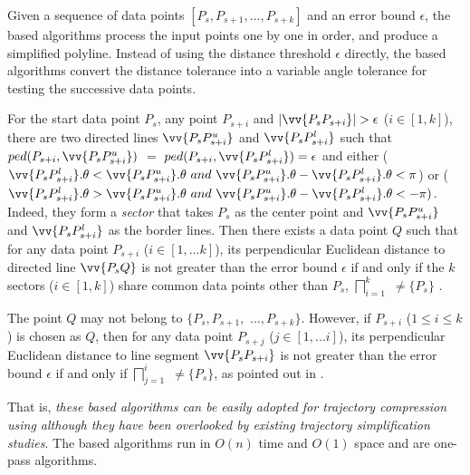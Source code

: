 
Given a sequence of data points $[P_{s}, P_{s+1}, \ldots, P_{s+k}]$ and an error bound $\epsilon$, the \cia based algorithms process the input points one by one in order, and produce a simplified polyline.  Instead of using the distance threshold $\epsilon$ directly, the \cia based algorithms convert the distance tolerance into a variable angle tolerance for testing the successive data points.

For the start data point $P_s$, any point $P_{s+i}$ and $|\vv{P_sP_{s+i}}|>\epsilon$ ($i\in[1, k]$), there are two directed lines $\vv{P_sP^u_{s+i}}$ and $\vv{P_sP^l_{s+i}}$ such that $ped(P_{s+i}, \vv{P_sP^u_{s+i}})$ $=$ $ped(P_{s+i}, \vv{P_sP^l_{s+i}}) = \epsilon$ and either ($\vv{P_sP^l_{s+i}}.\theta < \vv{P_sP^u_{s+i}}.\theta ~and~\vv{P_sP^u_{s+i}}.\theta - \vv{P_sP^l_{s+i}}.\theta <\pi$) or ($\vv{P_sP^l_{s+i}}.\theta > \vv{P_sP^u_{s+i}}.\theta ~and~ \vv{P_sP^u_{s+i}}.\theta - \vv{P_sP^l_{s+i}}.\theta < -\pi)$. Indeed, they form a \emph{sector}  that takes $P_s$ as the center point and $\vv{P_sP^u_{s+i}}$ and $\vv{P_sP^l_{s+i}}$ as the border lines.
Then there exists a data point $Q$ such that for any data point $P_{s+i}$ ($i \in [1, ... k]$), its perpendicular Euclidean distance to
directed line $\vv{P_sQ}$ is not greater than the error bound $\epsilon$ if and only if the $k$ sectors  ($i\in[1,k]$) share common data points other than $P_s$, \ie $\bigsqcap_{i=1}^{k}$ $\ne \{P_s\}$ \cite{Williams:Longest, Sklansky:Cone,Zhao:Sleeve}.

The point $Q$ may not belong to $\{P_{s}, P_{s+1},$ $\ldots, P_{s+k}\}$.
However, if $P_{s+i}$ ($1\le i\le k$) is chosen as $Q$, then
for any data point $P_{s+j}$ ($j \in [1, ... i]$), its perpendicular Euclidean distance to
line segment $\vv{P_sP_{s+i}}$ is not greater than the error bound $\epsilon$ if and only if $\bigsqcap_{j=1}^{i}$ $\ne \{P_s\}$, as pointed out in \cite{Zhao:Sleeve}.

That is, {\em these \cia based algorithms can be easily adopted for trajectory compression using \ped although they have been overlooked by existing trajectory simplification studies}.
The \cia based algorithms run in $O(n)$ time and $O(1)$ space and are one-pass algorithms.


